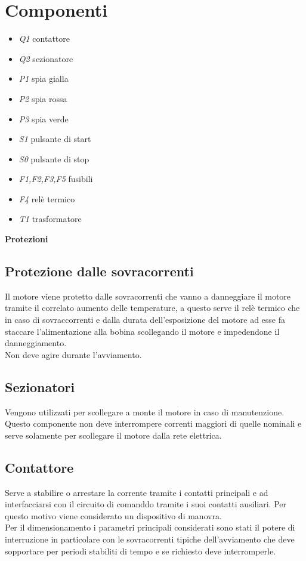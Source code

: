 \documentclass[12pt]{article}
\begin{document}
\section{Componenti}
\label{Componenti}
\begin{itemize}
    \item \emph{Q1} contattore
          
    \item \emph{Q2} sezionatore
          
    \item \emph{P1} spia gialla 
    \item \emph{P2} spia rossa
    \item \emph{P3} spia verde 
    \item \emph{S1} pulsante di start
    \item \emph{S0} pulsante di stop
    \item \emph{F1,F2,F3,F5} fusibili
    \item \emph{F4} relè termico
    \item \emph{T1} trasformatore
\end{itemize}
\vspace{15pt}
\begin{Large}
\textbf{Protezioni} 
\end{Large}
\subsection*{Protezione dalle sovracorrenti}
Il motore viene protetto dalle sovracorrenti che vanno a danneggiare il motore tramite il correlato aumento delle temperature, a questo serve il relè termico che in caso di sovraccorrenti e dalla durata dell'esposizione del motore ad esse fa staccare l'alimentazione alla bobina scollegando il motore e impedendone il danneggiamento.\\
Non deve agire durante l'avviamento.
\subsection*{Sezionatori}
Vengono utilizzati per scollegare a monte il motore in caso di manutenzione.\\
Questo componente non deve interrompere correnti maggiori di quelle nominali e serve solamente per scollegare il motore dalla rete elettrica.\\
\subsection*{Contattore}
Serve a stabilire o arrestare la corrente tramite i contatti principali e ad interfacciarsi con il circuito di comanddo tramite i suoi contatti ausiliari. Per questo motivo viene considerato un dispositivo di manovra.\\
Per il dimensionamento i parametri principali considerati sono stati il potere di interruzione in particolare con le sovracorrenti tipiche dell'avviamento che deve sopportare per periodi stabiliti di tempo e se richiesto deve interromperle.
\end{document}
